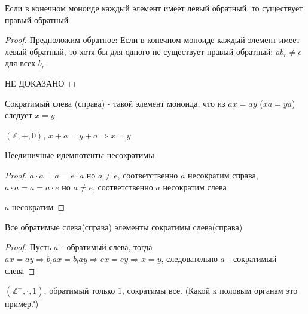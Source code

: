 \documentclass[../main/document.tex]{subfiles}
\begin{document}
\begin{thm}
Если в конечном моноиде каждый элемент имеет левый обратный, то существует правый обратный
\begin{proof}
Предположим обратное: Если в конечном моноиде каждый элемент имеет левый обратный, то хотя бы для одного не существует правый обратный: $ab_r\neq e$ для всех $b_r$

НЕ ДОКАЗАНО
\end{proof}
\end{thm}

\begin{dfn}
Сократимый слева (справа) - такой элемент моноида, что из $ax=ay$ ($xa=ya$) следует $x=y$ 
\end{dfn}
\begin{exm}
$(\mathbb{Z},+,0)$, $x+a=y+a\Rightarrow x=y$
\end{exm}
\begin{thm}
Неединичные идемпотенты несократимы
\begin{proof}
$a\cdot a=a=e\cdot a$ но $a\neq e$, соответственно $a$ несократим справа,
$a\cdot a=a=a\cdot e$ но $a\neq e$, соответственно $a$ несократим слева

$a$ несократим
\end{proof}
\end{thm}
\begin{thm}
Все обратимые слева(справа) элементы сократимы слева(справа)
\begin{proof}
Пусть $a$ - обратимый слева, тогда
$ax=ay\Rightarrow b_lax=b_lay\Rightarrow ex=ey\Rightarrow x=y$, следовательно $a$ - сократимый слева
\end{proof}
\end{thm}
\begin{exm}
$(\mathbb{Z}^+,\cdot,1)$, обратимый только $1$, сократимы все. (Какой к половым органам это пример?)
\end{exm}
\end{document}
